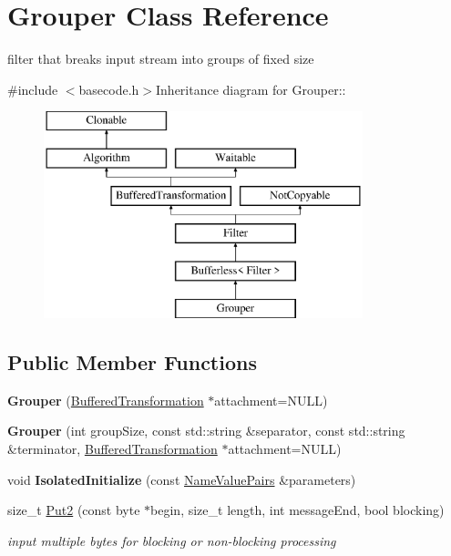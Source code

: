 \hypertarget{class_grouper}{
\section{Grouper Class Reference}
\label{class_grouper}
}


filter that breaks input stream into groups of fixed size  


{\ttfamily \#include $<$basecode.h$>$}Inheritance diagram for Grouper::\begin{figure}[H]
\begin{center}
\leavevmode
\includegraphics[height=6cm]{class_grouper}
\end{center}
\end{figure}
\subsection*{Public Member Functions}
\begin{DoxyCompactItemize}
\item 
\hypertarget{class_grouper_a1504a3d63aa08dad626f6b9303c408c7}{
{\bfseries Grouper} (\hyperlink{class_buffered_transformation}{BufferedTransformation} $\ast$attachment=NULL)}
\label{class_grouper_a1504a3d63aa08dad626f6b9303c408c7}

\item 
\hypertarget{class_grouper_a12bd35621c9c3974ee5ca6147a6a8ec7}{
{\bfseries Grouper} (int groupSize, const std::string \&separator, const std::string \&terminator, \hyperlink{class_buffered_transformation}{BufferedTransformation} $\ast$attachment=NULL)}
\label{class_grouper_a12bd35621c9c3974ee5ca6147a6a8ec7}

\item 
\hypertarget{class_grouper_af44beea74b2140892d24aa635a7f3dcd}{
void {\bfseries IsolatedInitialize} (const \hyperlink{class_name_value_pairs}{NameValuePairs} \&parameters)}
\label{class_grouper_af44beea74b2140892d24aa635a7f3dcd}

\item 
size\_\-t \hyperlink{class_grouper_a21cb0add26fcf2607329927714f4e3bb}{Put2} (const byte $\ast$begin, size\_\-t length, int messageEnd, bool blocking)
\begin{DoxyCompactList}\small\item\em input multiple bytes for blocking or non-\/blocking processing \item\end{DoxyCompactList}\end{DoxyCompactItemize}


